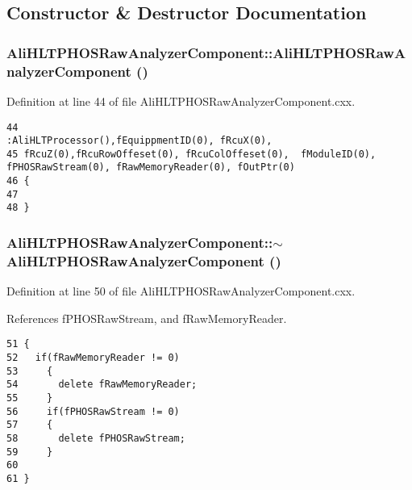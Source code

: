 \subsection{Constructor \& Destructor Documentation}
\subsubsection{\setlength{\rightskip}{0pt plus 5cm}Ali\-HLTPHOSRaw\-Analyzer\-Component::Ali\-HLTPHOSRaw\-Analyzer\-Component ()}\label{classAliHLTPHOSRawAnalyzerComponent_AliHLTPHOSRawAnalyzerComponenta0}




Definition at line 44 of file Ali\-HLTPHOSRaw\-Analyzer\-Component.cxx.

\footnotesize\begin{verbatim}44                                                               :AliHLTProcessor(),fEquippmentID(0), fRcuX(0), 
45 fRcuZ(0),fRcuRowOffeset(0), fRcuColOffeset(0),  fModuleID(0), fPHOSRawStream(0), fRawMemoryReader(0), fOutPtr(0)
46 {
47 
48 } 
\end{verbatim}\normalsize 


\subsubsection{\setlength{\rightskip}{0pt plus 5cm}Ali\-HLTPHOSRaw\-Analyzer\-Component::$\sim${\bf Ali\-HLTPHOSRaw\-Analyzer\-Component} ()}\label{classAliHLTPHOSRawAnalyzerComponent_AliHLTPHOSRawAnalyzerComponenta1}




Definition at line 50 of file Ali\-HLTPHOSRaw\-Analyzer\-Component.cxx.

References f\-PHOSRaw\-Stream, and f\-Raw\-Memory\-Reader.

\footnotesize\begin{verbatim}51 {
52   if(fRawMemoryReader != 0)
53     {
54       delete fRawMemoryReader;
55     }
56     if(fPHOSRawStream != 0)
57     {
58       delete fPHOSRawStream;
59     }
60 
61 }
\end{verbatim}\normalsize 


